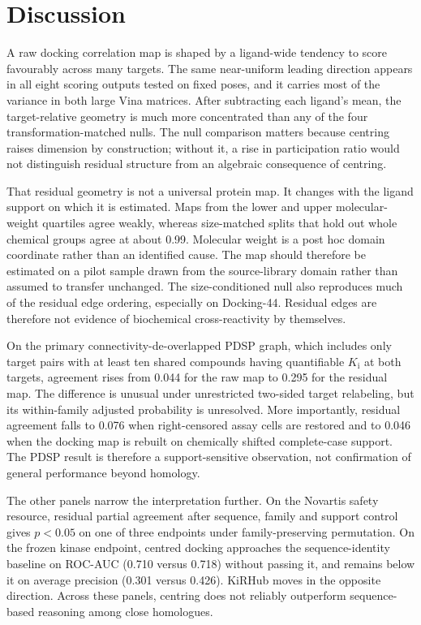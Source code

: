 \section{Discussion}

A raw docking correlation map is shaped by a ligand-wide tendency to score favourably across many
targets. The same near-uniform leading direction appears
in all eight scoring outputs tested on fixed poses, and it carries most of the variance in both
large Vina matrices. After subtracting each ligand's mean, the target-relative geometry is much
more concentrated than any of the four transformation-matched nulls. The
null comparison matters because centring raises dimension by construction; without it, a rise in
participation ratio would not distinguish residual structure from an algebraic consequence of centring.

That residual geometry is not a universal protein map. It changes with the ligand support on which
it is estimated. Maps from the lower and upper molecular-weight quartiles agree weakly, whereas
size-matched splits that hold out whole chemical groups agree at about 0.99. Molecular weight is a
post hoc domain coordinate rather than an identified cause. The map should therefore be estimated on
a pilot sample drawn from the source-library domain rather than assumed to transfer unchanged.
The size-conditioned null also reproduces much of the residual edge ordering, especially on
Docking-44. Residual edges are therefore not evidence of biochemical cross-reactivity by themselves.

On the primary connectivity-de-overlapped PDSP graph, which includes only target pairs with at least ten shared
compounds having quantifiable $K_\text{i}$ at both targets, agreement rises from 0.044 for the raw
map to 0.295 for the residual map. The difference is unusual under unrestricted two-sided target
relabeling, but its within-family adjusted probability is unresolved. More importantly, residual
agreement falls to 0.076 when right-censored assay cells are restored and to 0.046 when the docking
map is rebuilt on chemically shifted complete-case support. The PDSP result is therefore a
support-sensitive observation, not confirmation of general performance beyond homology.

The other panels narrow the interpretation further. On the Novartis safety resource, residual
partial agreement after sequence, family and support control gives $p<0.05$ on one of three
endpoints under family-preserving permutation. On the frozen kinase endpoint, centred docking
approaches the sequence-identity baseline on ROC-AUC (0.710 versus 0.718) without passing it, and remains below it on average
precision (0.301 versus 0.426). KiRHub moves in the opposite direction. Across these panels, centring
does not reliably outperform sequence-based reasoning among close homologues.

